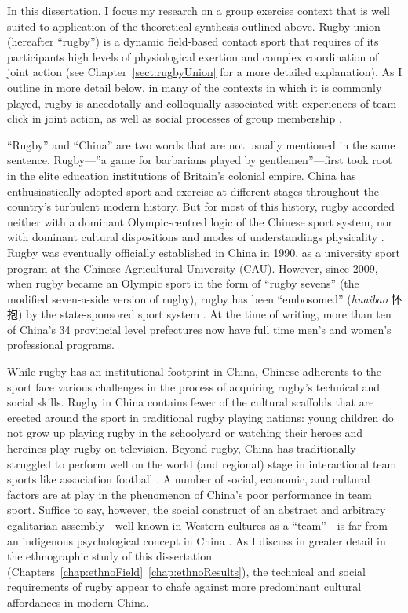 \begin{CJK}{UTF8}{gbsn}
In this dissertation, I focus my research on a group exercise context that is well suited to application of the theoretical synthesis outlined above.  Rugby union (hereafter ``rugby'') is a dynamic field-based contact sport that requires of its participants high levels of physiological exertion and complex coordination of joint action  (see Chapter~\ref{sect:rugbyUnion} for a more detailed explanation).  As I outline in more detail below, in many of the contexts in which it is commonly played, rugby is anecdotally and colloquially associated with experiences of team click in joint action, as well as social processes of group membership \citep{Dunning2005}.

``Rugby'' and ``China'' are two words that are not usually mentioned in the same sentence.  Rugby---''a game for barbarians played by gentlemen''---first took root in the elite education institutions of Britain's colonial empire.  China has enthusiastically adopted sport and exercise at different stages throughout the country's turbulent modern history. But for most of this history, rugby accorded neither with a dominant Olympic-centred logic of the Chinese sport system, nor with dominant cultural dispositions and modes of understandings physicality \citep[which derived from hundreds of years of continuous history of Confucian and Daoist traditions of thought, see][]{Morris2004}.  Rugby was eventually officially established in China in 1990, as a university sport program at the Chinese Agricultural University (CAU).  However, since 2009, when rugby became an Olympic sport in the form of ``rugby sevens'' (the modified seven-a-side version of rugby), rugby has been ``embosomed'' (\textit{huaibao} 怀抱) by the state-sponsored sport system \citep{Xu2010}.  At the time of writing, more than ten of China's 34 provincial level prefectures now have full time men's and women's professional programs.

While rugby has an institutional footprint in China, Chinese adherents to the sport face various challenges in the process of acquiring rugby's technical and social skills.  Rugby in China contains fewer of the cultural scaffolds that are erected around the sport in traditional rugby playing nations: young children do not grow up playing rugby in the schoolyard or watching their heroes and heroines play rugby on television.  Beyond rugby, China has traditionally struggled to perform well on the world (and regional) stage in interactional team sports like association football \citep{Gallagher2018}.  A number of social, economic, and cultural factors are at play in the phenomenon of China's poor performance in team sport.  Suffice to say, however, the social construct of an abstract and arbitrary egalitarian assembly---well-known in Western cultures as a ``team''---is far from an indigenous psychological concept in China \cite[instead, the family functions as a primary metaphor for social interaction][]{Liu2009}.  As I discuss in greater detail in the ethnographic study of this dissertation (Chapters~\ref{chap:ethnoField}\nobreakdash~\ref{chap:ethnoResults}), the technical and social requirements of rugby appear to chafe against more predominant cultural affordances in modern China.


\end{CJK}
